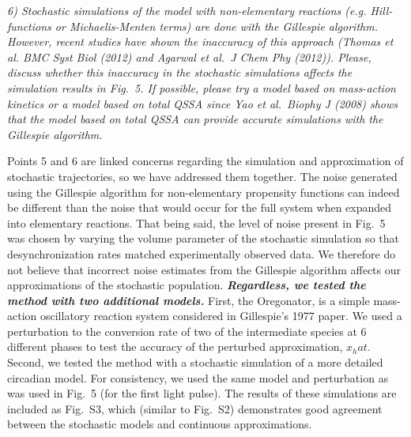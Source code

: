 \documentclass[11pt, letterpaper]{article}
\newenvironment{reviewer}{\itshape\color{gray}}{}
\begin{document}
\begin{reviewer}
6) Stochastic simulations of the model with non-elementary reactions (e.g.
Hill-functions or Michaelis-Menten terms) are done with the Gillespie algorithm.
However, recent studies have shown the inaccuracy of this approach (Thomas et al.
BMC Syst Biol (2012) and Agarwal et al.\ J Chem Phy (2012)).
Please, discuss whether this inaccuracy in the stochastic simulations affects the simulation results in Fig.~5.
If possible, please try a model based on mass-action kinetics or a model based on total QSSA since Yao et al.\ Biophy J (2008) shows that the model based on total QSSA can provide accurate simulations with the Gillespie algorithm.
\end{reviewer}
 
Points 5 and 6 are linked concerns regarding the simulation and approximation of stochastic trajectories, so we have addressed them together.
The noise generated using the Gillespie algorithm for non-elementary propensity functions can indeed be different than the noise that would occur for the full system when expanded into elementary reactions.
That being said, the level of noise present in Fig.~5 was chosen by varying the volume parameter of the stochastic simulation so that desynchronization rates matched experimentally observed data.
We therefore do not believe that incorrect noise estimates from the Gillespie algorithm affects our approximations of the stochastic population.
{\itshape\bfseries Regardless, we tested the method with two additional models.}
First, the Oregonator, is a simple mass-action oscillatory reaction system considered in Gillespie's 1977 paper.
We used a perturbation to the conversion rate of two of the intermediate species at 6 different phases to test the accuracy of the perturbed approximation, $x_hat$.
Second, we tested the method with a stochastic simulation of a more detailed circadian model.
For consistency, we used the same model and perturbation as was used in Fig.~5 (for the first light pulse).
The results of these simulations are included as Fig.~S3, which (similar to Fig.~S2) demonstrates good agreement between the stochastic models and continuous approximations.
\end{document}
